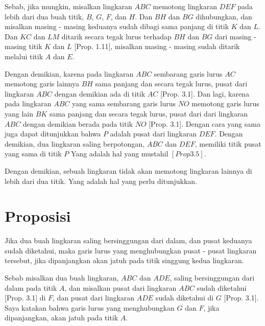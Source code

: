 \documentclass[a4paper]{book}
\begin{document}
Sebab, jika mungkin, misalkan lingkaran $ABC$ memotong lingkaran $DEF$
pada lebih dari dua buah titik, $B$, $G$, $F$, dan $H$. Dan $BH$ dan 
$BG$ dihubungkan, dan misalkan masing - masing keduanya sudah dibagi 
sama panjang di titik $K$ dan $L$. Dan $KC$ dan $LM$ ditarik secara tegak
lurus terhadap $BH$ dan $BG$ dari masing - masing titik $K$ dan $L$ 
[Prop. 1.11], misalkan masing - masing sudah ditarik melalui titik $A$ 
dan $E$.

Dengan demikian, karena pada lingkaran $ABC$ sembarang garis lurus $AC$
memotong garis lainnya $BH$ sama panjang dan secara tegak lurus, 
pusat dari 
lingkaran $ABC$ dengan demikian ada di titik $AC$ [Prop. 3.1]. Dan 
lagi, karena pada lingkaran $ABC$ yang sama sembarang garis lurus $NO$
memotong garis lurus yang lain $BK$ sama panjang dan secara tegak lurus,
pusat dari dari lingkaran $ABC$ dengan demikian berada pada titik $NO$
[Prop. 3.1]. Dengan cara yang sama juga dapat ditunjukkan bahwa $P$ 
adalah pusat dari lingkaran $DEF$. Dengan demikian, dua lingkaran saling
berpotongan, $ABC$ dan $DEF$, memiliki titik pusat yang sama di titik $P$
Yang adalah hal yang mustahil $[Prop 3.5]$.

Dengan demikian, sebuah lingkaran tidak akan memotong lingkaran lainnya
di lebih dari dua titik. Yang adalah hal yang perlu ditunjukkan.  

\section*{\centering Proposisi \thesection}
Jika dua buah lingkaran saling bersinggungan dari dalam, dan pusat
keduanya sudah diketahui, maka garis lurus yang menghubungkan pusat - 
pusat lingkaran tersebut, jika dipanjangkan akan jatuh pada titik 
singgung kedua lingkaran.
\begin{center}
\end{center}
Sebab misalkan dua buah lingkaran, $ABC$ dan $ADE$, saling bersinggungan
dari dalam pada titik $A$, dan misalkan pusat dari lingkaran 
$ABC$ sudah diketahui [Prop. 3.1] di $F$, dan pusat dari lingkaran $ADE$
sudah diketahui di $G$ [Prop. 3.1]. Saya katakan bahwa garis lurus
yang menghubungkan $G$ dan $F$, jika dipanjangkan, akan jatuh pada 
titik $A$.
\end{document}
